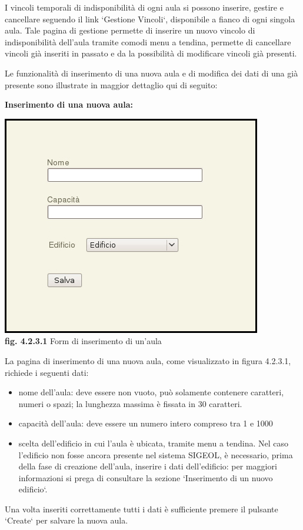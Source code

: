 \documentclass[11pt,a4paper]{article}
\begin{document}
I vincoli temporali di indisponibilità di ogni aula si possono inserire, gestire e cancellare seguendo il link `Gestione Vincoli`, disponibile a fianco di ogni singola aula. Tale pagina di gestione permette di inserire un nuovo vincolo di indisponibilità dell'aula tramite comodi menu a tendina, permette di cancellare vincoli già inseriti in passato e da la possibilità di modificare vincoli già presenti.

Le funzionalità di inserimento di una nuova aula e di modifica dei dati di una già presente sono illustrate in maggior dettaglio qui di seguito:
\newline \newline
\begin{large}\textbf{Inserimento di una nuova aula:}\end{large}

\begin{center}
	\includegraphics[scale=0.5]{images/nuova_aula.jpg}\\
	\textbf{fig. 4.2.3.1} Form di inserimento di un'aula\\
\end{center}

La pagina di inserimento di una nuova aula, come visualizzato in figura 4.2.3.1, richiede i seguenti dati:
\begin{itemize}
 \item nome dell'aula: deve essere non vuoto, può solamente contenere caratteri, numeri o spazi; la lunghezza massima è fissata in 30 caratteri. 
 \item capacità dell'aula: deve essere un numero intero compreso tra 1 e 1000
 \item scelta dell'edificio in cui l'aula è ubicata, tramite menu a tendina. Nel caso l'edificio non fosse ancora presente nel sistema SIGEOL, è necessario, prima della fase di creazione dell'aula, inserire i dati dell'edificio: per maggiori informazioni si prega di consultare la sezione `Inserimento di un nuovo edificio`.
\end{itemize}
Una volta inseriti correttamente tutti i dati è sufficiente premere il pulsante `Create` per salvare la nuova aula.
\end{document}
